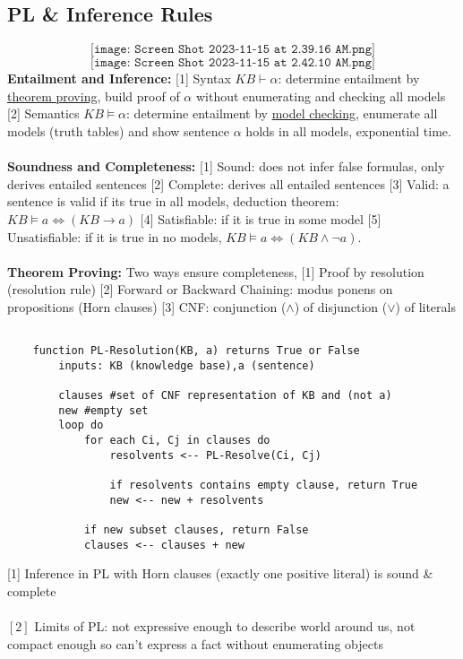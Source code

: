 \subsection{PL & Inference Rules}
$$
\texttt{[image: Screen Shot 2023-11-15 at 2.39.16 AM.png]}
$$
$$
\texttt{[image: Screen Shot 2023-11-15 at 2.42.10 AM.png]}
$$
\textbf{Entailment and Inference:} [1] Syntax $KB \vdash \alpha$: determine entailment by \underline{theorem proving}, build proof of $\alpha$ without enumerating and checking all models [2] Semantics $KB \vDash \alpha$: determine entailment by \underline{model checking}, enumerate all models (truth tables) and show sentence $\alpha$ holds in all models, exponential time.\\
\\
\textbf{Soundness and Completeness:} [1] Sound: does not infer false formulas, only derives entailed sentences [2] Complete: derives all entailed sentences [3] Valid: a sentence is valid if its true in all models, deduction theorem: $KB \vDash a \iff (KB \rightarrow a)$ [4] Satisfiable: if it is true in some model [5] Unsatisfiable: if it is true in no models, $KB \vDash a \iff (KB \wedge \neg a)$.\\
\\
\textbf{Theorem Proving:} Two ways ensure completeness, [1] Proof by resolution (resolution rule) [2] Forward or Backward Chaining: modus ponens on propositions (Horn clauses) [3] CNF: conjunction ($\wedge$) of disjunction ($\vee$) of literals
\begin{lstlisting}

    function PL-Resolution(KB, a) returns True or False
        inputs: KB (knowledge base),a (sentence)

        clauses #set of CNF representation of KB and (not a)
        new #empty set
        loop do
            for each Ci, Cj in clauses do
                resolvents <-- PL-Resolve(Ci, Cj)
                
                if resolvents contains empty clause, return True
                new <-- new + resolvents
                
            if new subset clauses, return False
            clauses <-- clauses + new
\end{lstlisting} 
[1] Inference in PL with Horn clauses (exactly one positive literal) is sound \& complete\\
\\
$[2]$ Limits of PL: not expressive enough to describe world around us, not compact enough so can't express a fact without enumerating objects\\
